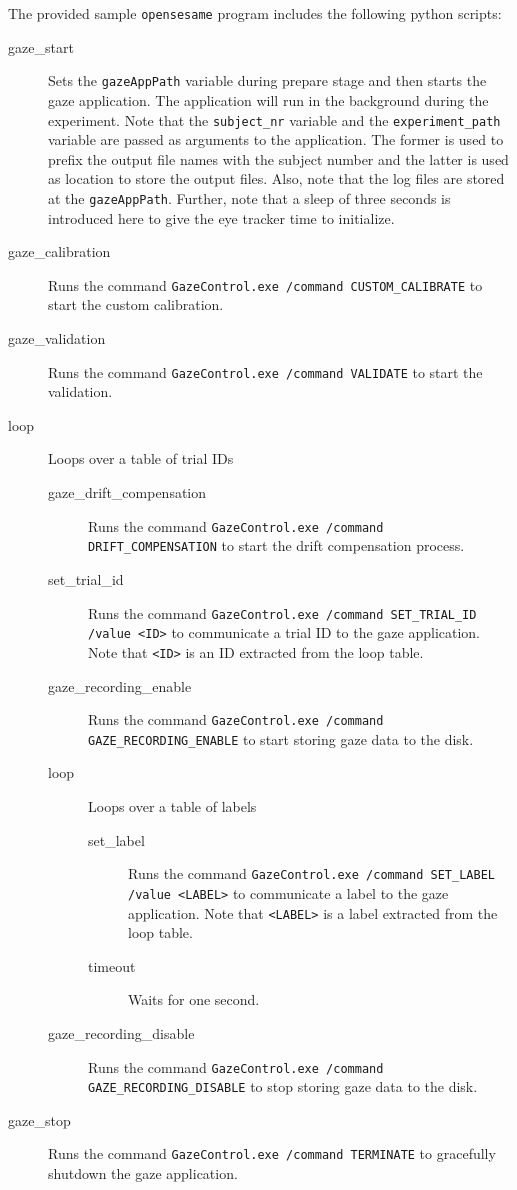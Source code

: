 \documentclass[a4paper,oneside]{book}
\begin{document}
The provided sample \texttt{opensesame} program includes the following python scripts:
\begin{description}
    \item[gaze\_start]
        Sets the \texttt{gazeAppPath} variable during prepare stage and then starts the gaze application.
        The application will run in the background during the experiment.
        Note that the \texttt{subject\_nr} variable and the \texttt{experiment\_path} variable are passed as arguments to the application.
        The former is used to prefix the output file names with the subject number and the latter is used as location to store the output files.
        Also, note that the log files are stored at the \texttt{gazeAppPath}.
        Further, note that a sleep of three seconds is introduced here to give the eye tracker time to initialize.
    \item[gaze\_calibration]
        Runs the command \texttt{GazeControl.exe /command CUSTOM\_CALIBRATE} to start the custom calibration.
    \item[gaze\_validation]
        Runs the command \texttt{GazeControl.exe /command VALIDATE} to start the validation.
    \item[loop]
        Loops over a table of trial IDs
        \begin{description}
            \item[gaze\_drift\_compensation]
                Runs the command \texttt{GazeControl.exe /command DRIFT\_COMPENSATION} to start the drift compensation process.
            \item[set\_trial\_id]
                Runs the command \texttt{GazeControl.exe /command SET\_TRIAL\_ID /value <ID>} to communicate a trial ID to the gaze application.
                Note that \texttt{<ID>} is an ID extracted from the loop table.
            \item[gaze\_recording\_enable]
                Runs the command \texttt{GazeControl.exe /command GAZE\_RECORDING\_ENABLE} to start storing gaze data to the disk.
            \item[loop]
                Loops over a table of labels
                \begin{description}
                    \item[set\_label]
                        Runs the command \texttt{GazeControl.exe /command SET\_LABEL /value <LABEL>} to communicate a label to the gaze application.
                        Note that \texttt{<LABEL>} is a label extracted from the loop table.
                    \item[timeout]
                        Waits for one second.
                \end{description}
            \item[gaze\_recording\_disable]
                Runs the command \texttt{GazeControl.exe /command GAZE\_RECORDING\_DISABLE} to stop storing gaze data to the disk.
        \end{description}
    \item[gaze\_stop]
        Runs the command \texttt{GazeControl.exe /command TERMINATE} to gracefully shutdown the gaze application.
\end{description}
\end{document}
